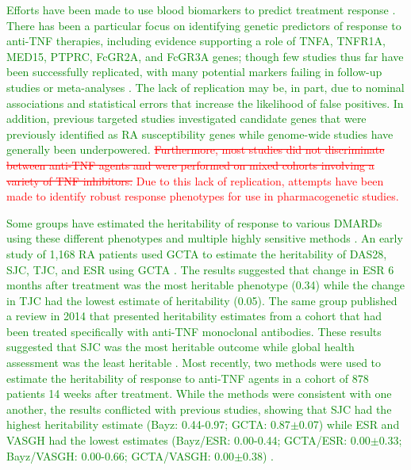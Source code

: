 \textcolor{green}{Efforts have been made to use blood biomarkers to predict treatment response \cite{krintel_prediction_2015}. There has been a particular focus on identifying genetic predictors of response to anti-TNF therapies, including evidence supporting a role of TNFA, TNFR1A, MED15, PTPRC, FcGR2A, and FcGR3A genes; though few studies thus far have been successfully replicated, with many potential markers failing in follow-up studies or meta-analyses \cite{yan_pharmacogenetics_2014,zervou_lack_2013,davila-fajardo_fcgr_2015,avila-pedretti_variation_2015,swierkot_analysis_2015}. The lack of replication may be, in part, due to nominal associations and statistical errors that increase the likelihood of false positives. In addition, previous targeted studies \textcolor{green}{investigated} candidate genes that were previously identified as RA susceptibility genes while genome-wide studies have generally been underpowered. \textcolor{red}{\st{Furthermore, most studies did not discriminate between anti-TNF agents and were performed on mixed cohorts involving a variety of TNF inhibitors.} Due to this lack of replication, attempts have been made to identify robust response phenotypes for use in pharmacogenetic studies.}


Some groups have estimated the heritability of response to various DMARDs using these different phenotypes and multiple highly sensitive methods \cite{2013_resp_herit_abstract,plant_genetic_2014,umicevic_mirkov_estimation_2014}. An early study of 1,168 RA patients used GCTA to estimate the heritability of DAS28, SJC, TJC, and ESR using GCTA \cite{2013_resp_herit_abstract}. The results suggested that change in ESR 6 months after treatment was the most heritable phenotype (0.34) while the change in TJC had the lowest estimate of heritability (0.05). The same group published a review in 2014 that presented heritability estimates from a cohort that had been treated specifically with anti-TNF monoclonal antibodies. These results suggested that SJC was the most heritable outcome while global health assessment was the least heritable \cite{plant_genetic_2014}. Most recently, two methods were used to estimate the heritability of response to anti-TNF agents in a cohort of 878 patients 14 weeks after treatment. While the methods were consistent with one another, the results conflicted with previous studies, showing that SJC had the highest heritability estimate (Bayz: 0.44-0.97; GCTA: 0.87$\pm$0.07) while ESR and VASGH had the lowest estimates (Bayz/ESR: 0.00-0.44; GCTA/ESR: 0.00$\pm$0.33; Bayz/VASGH: 0.00-0.66; GCTA/VASGH: 0.00$\pm$0.38) \cite{umicevic_mirkov_estimation_2014}.

}
